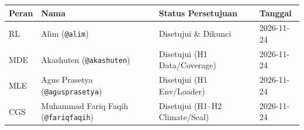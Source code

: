 \documentclass[11pt,a4paper]{article}
\begin{document}
\vspace{6mm}
\begin{table}[H]
\centering
\small
\begin{tabular}{@{}L{2.4cm}L{4.4cm}L{3.8cm}L{3.0cm}@{}}
\toprule
Peran & Nama & Status Persetujuan & Tanggal \\
\midrule
RL  & Alim (\texttt{@alim}) & Disetujui \& Dikunci & 2026-11-24 \\
MDE & Akashuten (\texttt{@akashuten}) & Disetujui (H1 Data/Coverage) & 2026-11-24 \\
MLE & Agus Prasetya (\texttt{@agusprasetya}) & Disetujui (H1 Env/Loader) & 2026-11-24 \\
CGS & Muhammad Fariq Faqih (\texttt{@fariqfaqih}) & Disetujui (H1--H2 Climate/Seal) & 2026-11-24 \\
\bottomrule
\end{tabular}
\end{table}
\end{document}
